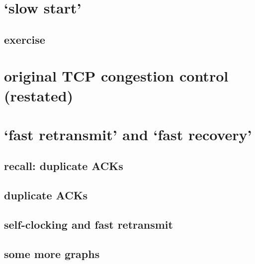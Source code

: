 
\section{`slow start'}

\subsection{exercise}


\section{original TCP congestion control (restated)}


\section{`fast retransmit' and `fast recovery'}



\subsection{recall: duplicate ACKs}


\subsection{duplicate ACKs}


\subsection{self-clocking and fast retransmit}


\subsection{some more graphs}



